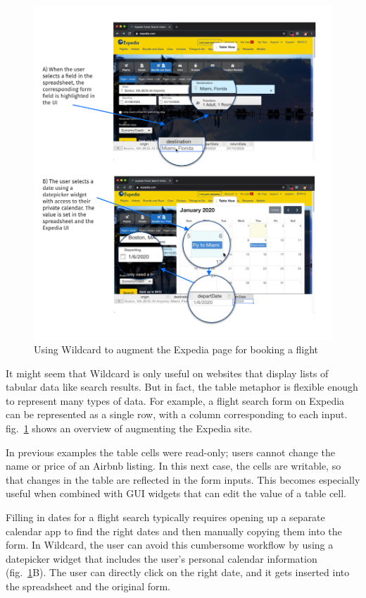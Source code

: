 \documentclass[english,submission]{programming}
\begin{document}
\begin{figure}
\hypertarget{fig:expedia-demo}{%
\centering
\includegraphics{media/expedia-demo-300dpi.png}
\caption{Using Wildcard to augment the Expedia page for booking a
flight}\label{fig:expedia-demo}
}
\end{figure}

It might seem that Wildcard is only useful on websites that display
lists of tabular data like search results. But in fact, the table
metaphor is flexible enough to represent many types of data. For
example, a flight search form on Expedia can be represented as a single
row, with a column corresponding to each input. {
fig.~\ref{fig:expedia-demo} shows an overview of augmenting the Expedia
site.}

In previous examples the table cells were read-only; users cannot change
the name or price of an Airbnb listing. In this next case, the cells are
writable, so that changes in the table are reflected in the form inputs.
This becomes especially useful when combined with GUI widgets that can
edit the value of a table cell.

Filling in dates for a flight search typically requires opening up a
separate calendar app to find the right dates and then manually copying
them into the form. In Wildcard, the user can avoid this cumbersome
workflow by using a datepicker widget that includes the user's personal
calendar information{ (fig.~\ref{fig:expedia-demo}B)}. The user can
directly click on the right date, and it gets inserted into the
spreadsheet and the original form.
\end{document}
